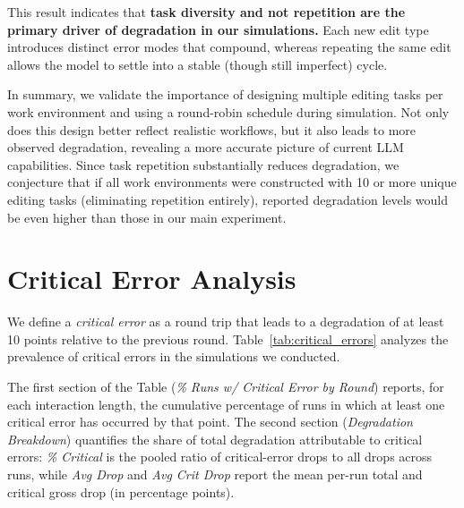 \documentclass{article} %
\begin{document}
This result indicates that \textbf{task diversity and not repetition are the primary driver of degradation in our simulations.} Each new edit type introduces distinct error modes that compound, whereas repeating the same edit allows the model to settle into a stable (though still imperfect) cycle.

In summary, we validate the importance of designing multiple editing tasks per work environment and using a round-robin schedule during simulation. Not only does this design better reflect realistic workflows, but it also leads to more observed degradation, revealing a more accurate picture of current LLM capabilities. Since task repetition substantially reduces degradation, we conjecture that if all work environments were constructed with 10 or more unique editing tasks (eliminating repetition entirely), reported degradation levels would be even higher than those in our main experiment.


\section{Critical Error Analysis} \label{app:critical_errors}

\begin{table}[h]
    \centering
    \resizebox{0.8\textwidth}{!}{}
    \caption{Critical error analysis (10+ drop within single round). \textit{Left:} cumulative \% of runs with at least one critical error after N interactions. \textit{Right:} share of total degradation from critical errors and average per-run drop magnitudes. Models sorted by round-20 critical error rate (ascending).}
    \label{tab:critical_errors}
\end{table}

We define a \textit{critical error} as a round trip that leads to a degradation of at least 10 points relative to the previous round. Table~\ref{tab:critical_errors} analyzes the prevalence of critical errors in the simulations we conducted.

The first section of the Table (\textit{\% Runs w/ Critical Error by Round}) reports, for each interaction length, the cumulative percentage of runs in which at least one critical error has occurred by that point. The second section (\textit{Degradation Breakdown}) quantifies the share of total degradation attributable to critical errors: \textit{\% Critical} is the pooled ratio of critical-error drops to all drops across runs, while \textit{Avg Drop} and \textit{Avg Crit Drop} report the mean per-run total and critical gross drop (in percentage points).
\end{document}
